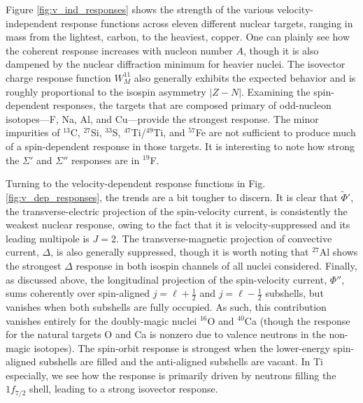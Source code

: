 \documentclass{book}[letterpaper,12pt]
\begin{document}
Figure \ref{fig:v_ind_responses} shows the strength of the various velocity-independent response functions across eleven different nuclear targets, ranging in mass from the lightest, carbon, to the heaviest, copper. One can plainly see how the coherent response increases with nucleon number $A$, though it is also dampened by the nuclear diffraction minimum for heavier nuclei. The isovector charge response function $W_M^{11}$ also generally exhibits the expected behavior and is roughly proportional to the isospin asymmetry $|Z-N|$. Examining the spin-dependent responses, the targets that are composed primary of odd-nucleon isotopes---F, Na, Al, and Cu---provide the strongest response. The minor impurities of $^{13}$C, $^{27}$Si, $^{33}$S, $^{47}$Ti/$^{49}$Ti, and $^{57}$Fe are not sufficient to produce much of a spin-dependent response in those targets. It is interesting to note how strong the $\Sigma'$ and $\Sigma''$ responses are in $^{19}$F.

Turning to the velocity-dependent response functions in Fig. \ref{fig:v_dep_responses}, the trends are a bit tougher to discern. It is clear that $\tilde{\Phi}'$, the transverse-electric projection of the spin-velocity current, is consistently the weakest nuclear response, owing to the fact that it is velocity-suppressed and its leading multipole is $J=2$. The transverse-magnetic projection of convective current, $\Delta$, is also generally suppressed, though it is worth noting that $^{27}$Al shows the strongest $\Delta$ response in both isospin channels of all nuclei considered. Finally, as discussed above, the longitudinal projection of the spin-velocity current, $\Phi''$, sums coherently over spin-aligned $j=\ell+\frac{1}{2}$ and $j=\ell-\frac{1}{2}$ subshells, but vanishes when both subshells are fully occupied. As such, this contribution vanishes entirely for the doubly-magic nuclei $^{16}$O and $^{40}$Ca (though the response for the natural targets O and Ca is nonzero due to valence neutrons in the non-magic isotopes). The spin-orbit response is strongest when the lower-energy spin-aligned subshells are filled and the anti-aligned subshells are vacant. In Ti especially, we see how the response is primarily driven by neutrons filling the $1f_{7/2}$ shell, leading to a strong isovector response.
\end{document}
